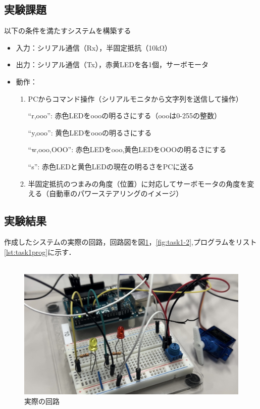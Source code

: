 \documentclass{ltjsarticle}
\begin{document}
\subsection{実験課題}
以下の条件を満たすシステムを構築する
\begin{itemize}
    \item 入力：シリアル通信（Rx），半固定抵抗（10kΩ）
    \item 出力：シリアル通信（Tx），赤黄LEDを各1個，サーボモータ
    \item 動作：\begin{enumerate}
              \item PCからコマンド操作（シリアルモニタから文字列を送信して操作）

                    “r,ooo”: 赤色LEDをoooの明るさにする（oooは0-255の整数）

                    “y,ooo”: 黄色LEDをoooの明るさにする

                    “w,ooo,OOO”: 赤色LEDをooo,黄色LEDをOOOの明るさにする

                    “s”: 赤色LEDと黄色LEDの現在の明るさをPCに送る
              \item 半固定抵抗のつまみの角度（位置）に対応してサーボモータの角度を変える（自動車のパワーステアリングのイメージ）
          \end{enumerate}
\end{itemize}

\subsection{実験結果}
作成したシステムの実際の回路，回路図を図\ref{fig:task1-1}，\ref{fig:task1-2},プログラムをリスト\ref{lst:task1prog}に示す．\\\\
\begin{figure}[h]
    \centering
    \includegraphics[width=\linewidth]{figures/task1.jpg}
    \caption{実際の回路}
    \label{fig:task1-1}
\end{figure}
\end{document}
